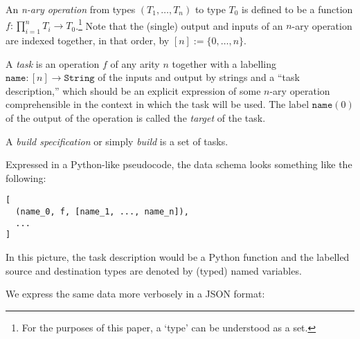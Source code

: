 \begin{definition}
  
  An \emph{n-ary operation} from types \((T_1,\ldots,T_n)\) to type \(T_0\) is defined to be a function \(f:\prod_{i=1}^n T_i \rightarrow T_0\).\footnote{For the purposes of this paper, a `type' can be understood as a set.}
  Note that the (single) output and inputs of an \(n\)-ary operation are indexed together, in that order, by \([n]:=\{0,\ldots,n\}\).

  A \emph{task} is an operation \(f\) of any arity \(n\) together with a labelling \(\mathtt{name}:[n]\rightarrow \mathtt{String}\) of the inputs and output by strings and a ``task description,'' which should be an explicit expression of some $n$-ary operation comprehensible in the context in which the task will be used.
  The label \(\mathtt{name}(0)\) of the output of the operation is called the \emph{target} of the task.

  A \emph{build specification} or simply \emph{build} is a set of tasks.

\end{definition}

Expressed in a Python-like pseudocode, the data schema looks something like the following:

\begin{lstlisting}
[
  (name_0, f, [name_1, ..., name_n]),
  ...
]
\end{lstlisting}

In this picture, the task description would be a Python function and the labelled source and destination types are denoted by (typed) named variables.

We express the same data more verbosely in a JSON format:

\begin{comment}
\begin{Shaded}
\begin{Highlighting}[]
\OtherTok{[}
    \FunctionTok{\{}
        \DataTypeTok{"target"}\FunctionTok{:} \FunctionTok{\{}\DataTypeTok{"label"}\FunctionTok{:} \StringTok{"name\_0"}\FunctionTok{,} \DataTypeTok{"type"}\FunctionTok{:} \StringTok{"T\_0"}\FunctionTok{\},}
        \DataTypeTok{"inputs"}\FunctionTok{:} \OtherTok{[}
            \FunctionTok{\{}\DataTypeTok{"label"}\FunctionTok{:} \StringTok{"name\_1"}\FunctionTok{,} \DataTypeTok{"type"}\FunctionTok{:} \StringTok{"T\_1"}\FunctionTok{\}}\OtherTok{,}
            \ErrorTok{...}\OtherTok{,}
            \FunctionTok{\{}\DataTypeTok{"label"}\FunctionTok{:} \StringTok{"name\_n"}\FunctionTok{,} \DataTypeTok{"type"}\FunctionTok{:} \StringTok{"T\_n"}\FunctionTok{\}}\OtherTok{,}
        \OtherTok{]}\FunctionTok{,}
        \DataTypeTok{"task"}\FunctionTok{:} \ErrorTok{@td}
    \FunctionTok{\}}\OtherTok{,}
    \ErrorTok{...}
\OtherTok{]}
\end{Highlighting}
\end{Shaded}
\end{comment}

